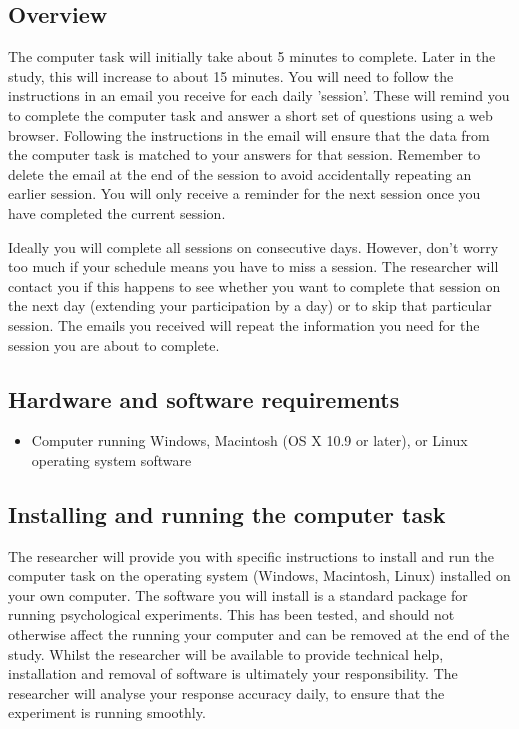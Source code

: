 \subsection{Overview}

The computer task will initially take about 5 minutes to complete. Later
in the study, this will increase to about 15 minutes. You will need
to follow the instructions in an email you receive for each daily
'session'. These will remind you to complete the computer task and
answer a short set of questions using a web browser. Following the
instructions in the email will ensure that the data from the computer
task is matched to your answers for that session.  Remember to delete
the email at the end of the session to avoid accidentally repeating an
earlier session. You will only receive a reminder for the next session
once you have completed the current session.

Ideally you will complete all sessions on consecutive days. However, don't
worry too much if your schedule means you have to miss a session. The
researcher will contact you if this happens to see whether you want to
complete that session on the next day (extending your participation by
a day) or to skip that particular session. The emails you received will
repeat the information you need for the session you are about to complete.

\subsection{Hardware and software requirements}
\begin{itemize}
\item Computer running Windows, Macintosh (OS X 10.9 or later), or Linux operating system software
\end{itemize}

\subsection{Installing and running the computer task}

The researcher will provide you with specific instructions to install
and run the computer task on the operating system (Windows, Macintosh,
Linux) installed on your own computer. The software you will install
is a standard package for running psychological experiments. This has
been tested, and should not otherwise affect the running your computer
and can be removed at the end of the study. Whilst the researcher will
be available to provide technical help, installation and removal of
software is ultimately your responsibility. The researcher will analyse
your response accuracy daily, to ensure that the experiment is running
smoothly.

